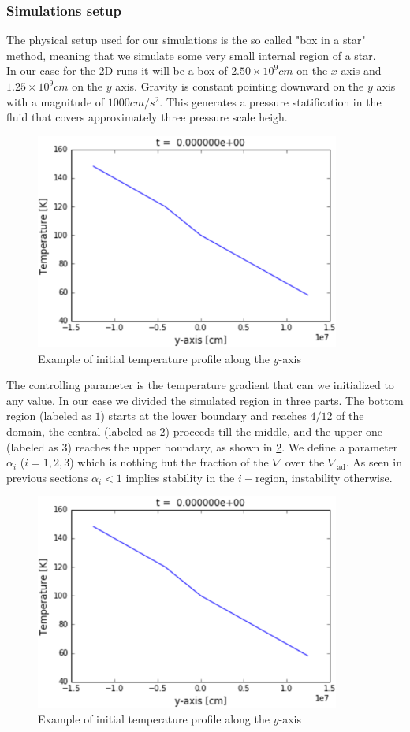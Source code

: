 \documentclass[11pt]{article}
\numberwithin{equation}{section}
\begin{document}
\subsubsection{Simulations setup}
The physical setup used for our simulations is the so called "box in a star" method, meaning that we simulate some very small internal region of a star. \\
In our case for the 2D runs it will be a box of $2.50 \times 10^{9} cm$ on the $x$ axis and $1.25 \times 10^{9} cm$ on the $y$ axis. Gravity is constant pointing downward on the $y$ axis with a magnitude of $1000 cm/s^2$. This generates a pressure statification in the fluid that covers approximately three pressure scale heigh. \\
\begin{figure}[t]
\includegraphics[width=10cm]{tempprofile}
\caption{Example of initial temperature profile along the $y$-axis}
\label{fig:tempprofile}
\centering
\end{figure}
The controlling parameter is the temperature gradient that can we initialized to any value. In our case we divided the simulated region in three parts. The bottom region (labeled as $1$) starts at the lower boundary and reaches $4/12$ of the domain, the central (labeled as $2$) proceeds till the middle, and the upper one (labeled as $3$) reaches the upper boundary, as shown in \ref{fig:tempprofile}. We define a parameter $\alpha_{i}$ ($i=1, 2, 3$) which is nothing but the fraction of the $\nabla$ over the $\nabla_{\mathrm{ad}}$. As seen in previous sections $\alpha_{i}<1$ implies stability in the $i-$region, instability otherwise. \\
\begin{figure}[t]
\includegraphics[width=10cm]{tempprofile}
\caption{Example of initial temperature profile along the $y$-axis}
\label{fig:tempprofile}
\centering
\end{figure}
\end{document}
